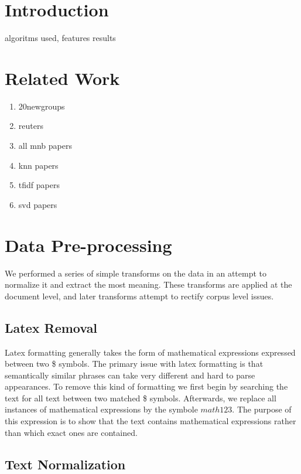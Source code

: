 \documentclass[10pt,twocolumn]{article}
\begin{document}
\section*{Introduction}

algoritms used, features results

\section* {Related Work}

\begin {enumerate}
\item 20newgroups
\item reuters
\item all mnb papers
\item knn papers
\item tfidf papers
\item svd papers
\end {enumerate}

\section*{Data Pre-processing}

We performed a series of simple transforms on the data in an attempt to normalize it and extract the most meaning. These transforms are applied at the document level, and later transforms attempt to rectify corpus level issues. 

\subsection*{Latex Removal}

Latex formatting generally takes the form of mathematical expressions expressed between two \$ symbols. The primary issue with latex formatting is that semantically similar phrases can take very different and hard to parse appearances. To remove this kind of formatting we first begin by searching the text for all text between two matched \$ symbols. Afterwards, we replace all instances of mathematical expressions by the symbole $math123$. The purpose of this expression is to show that the text contains mathematical expressions rather than which exact ones are contained. 

\subsection*{Text Normalization}
\end{document}

